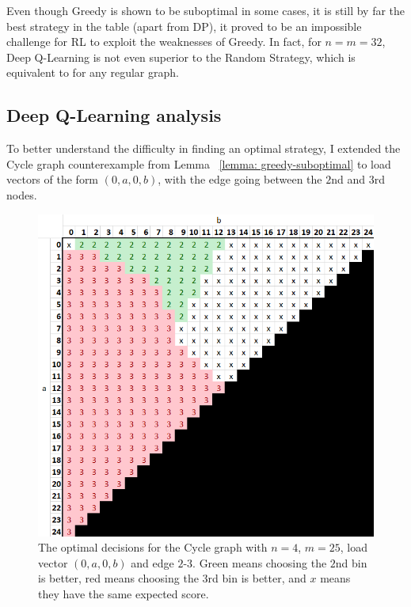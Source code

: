 Even though Greedy is shown to be suboptimal in some cases, it is still by far the best strategy in the table (apart from DP), it proved to be an impossible challenge for RL to exploit the weaknesses of Greedy. In fact, for $n=m=32$, Deep Q-Learning is not even superior to the Random Strategy, which is equivalent to \OneChoice for any regular graph.


\subsection{Deep Q-Learning analysis}

To better understand the difficulty in finding an optimal strategy, I extended the Cycle graph counterexample from Lemma ~\ref{lemma: greedy-suboptimal} to load vectors of the form $(0, a, 0, b)$, with the edge going between the $2$nd and $3$rd nodes. 


\begin{figure}[hbt!] \label{greedy-counterexample-analysed}
    \centering
    \includegraphics[scale=1.0]{Chapter4/Figs/0a0b_4_25_analysis.png}
    \caption{The optimal decisions for the Cycle graph with $n=4$, $m=25$, load vector $(0,a,0,b)$ and edge $2$-$3$. Green means choosing the $2$nd bin is better, red means choosing the $3$rd bin is better, and $x$ means they have the same expected score.}
\end{figure}


